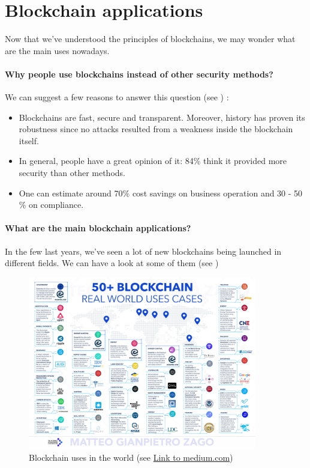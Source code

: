 \section{Blockchain applications}

Now that we've understood the principles of blockchains, we may wonder what are the main uses nowadays.

\paragraph{Why people use blockchains instead of other security methods?}

We can suggest a few reasons to answer this question (see \cite{blockchainPros}) :

\begin{itemize}
  \item Blockchains are fast, secure and transparent. Moreover, history has proven its robustness since no attacks resulted from a weakness inside the blockchain itself.
  \item In general, people have a great opinion of it: 84\% think it provided more security than other methods.
  \item One can estimate around 70\% cost savings on business operation and 30 - 50 \% on compliance.
\end{itemize}

\paragraph{What are the main blockchain applications?}

In the few last years, we've seen a lot of new blockchains being launched in different fields. We can have a look at some of them (see \cite{usesBlockchain})\newline

\begin{figure}[ht]
\centering
\includegraphics[width=10cm]{Figures/blockchainUses}
\caption{Blockchain uses in the world (see \href{https://medium.com/@matteozago/50-examples-of-how-blockchains-are-taking-over-the-world-4276bf488a4b}{Link to medium.com})}
\end{figure}
\medskip

